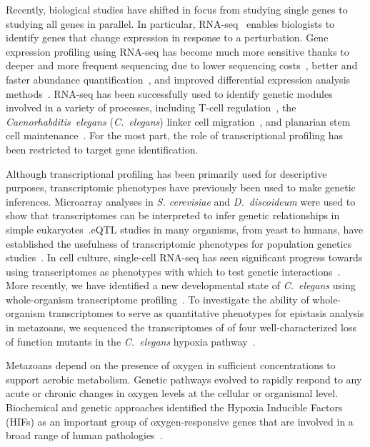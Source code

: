 \documentclass[10pt, onecolumn]{article}
\newcommand{\cel}{\emph{C.~elegans}}
\newcommand{\dicty}{\emph{D.~discoideum}}
\begin{document}
Recently, biological studies have shifted in focus from studying single
genes to studying all genes in parallel. In particular,
RNA-seq~\cite{Mortazavi2008} enables biologists to
identify genes that change expression in response to a perturbation. Gene expression
profiling using RNA-seq has become much more sensitive thanks to deeper and more
frequent sequencing due to lower sequencing costs~\cite{Metzker2010},
better and faster abundance quantification~\cite{Patro2014,Bray2016,Patro2015},
and improved differential expression analysis
methods~\cite{Pimentel2016,Trapnell2013}. RNA-seq has been
successfully used to identify genetic modules involved in a variety of processes,
including T-cell regulation~\cite{Singer2016,Shalek2013}, the
\emph{Caenorhabditis~elegans} (\cel{}) linker
cell migration~\cite{Schwarz2012}, and planarian stem cell
maintenance~\cite{VanWolfswinkel2014,Scimone2014}. For the most part, the role of
transcriptional profiling has been restricted to target gene identification.

Although transcriptional profiling has been primarily used for descriptive purposes,
transcriptomic phenotypes have previously been used to make genetic inferences.
Microarray analyses in \emph{S. cerevisiae} and \dicty{} were used to show
that transcriptomes can be interpreted to infer genetic relationships in simple
eukaryotes~\cite{Hughes2000, VanDriessche2005}.\@ eQTL studies in
many organisms, from yeast to humans, have established the usefulness of
transcriptomic phenotypes for population genetics studies~\cite{Brem2002,Schadt2003,
Li2006,King2014}. In cell culture, single-cell RNA-seq has seen significant
progress towards using transcriptomes as phenotypes with which to test genetic
interactions~\cite{Adamson2016,Dixit2016}.
More recently, we have identified a new developmental state
of \cel{} using whole-organism transcriptome profiling~\cite{Angeles-Albores2016a}.
To investigate the ability of whole-organism transcriptomes to serve as quantitative
phenotypes for epistasis analysis in metazoans, we sequenced the transcriptomes of
of four well-characterized loss of function mutants in the \cel{} hypoxia
pathway~\cite{Epstein2001,Shen2006,Shao2009,Jiang2001}.

Metazoans depend on the presence of oxygen in sufficient concentrations to
support aerobic metabolism. Genetic pathways evolved to rapidly respond to any
acute or chronic changes in oxygen levels at the cellular or organismal level.
Biochemical and genetic approaches identified the Hypoxia Inducible Factors
(HIFs) as an important group of oxygen-responsive genes that are involved in a
broad range of human pathologies~\cite{Semenza2012}.
\end{document}
